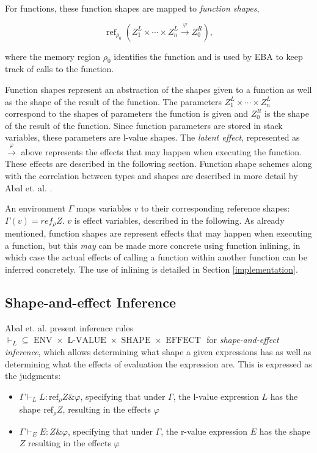 \newpar For functions, these function shapes are mapped to \textit{function shapes},

\begin{equation*}
    \operatorname{ref}_{\rho_{0}}\left(Z_{1}^{L} \times \cdots \times Z_{n}^{L} \stackrel{\varphi}{\rightarrow} Z_{0}^{R}\right),
\end{equation*} 

where the memory region $\rho_0$ identifies the function and is used by EBA to keep track of calls to the function.

\newpar Function shapes represent an abstraction of the shapes given to a function as well as the shape of the result of the function. The parameters $Z_{1}^{L} \times \cdots \times Z_{n}^{L}$ correspond to the shapes of parameters the function is given and $Z_{0}^{R}$ is the shape of the result of the function. Since function parameters are stored in stack variables, these parameters are l-value shapes. The \textit{latent effect}, represented as $\stackrel{\varphi}{\rightarrow}$ above represents the effects that may happen when executing the function. These effects are described in the following section. Function shape schemes along with the correlation between types and shapes are described in more detail by Abal et. al. \cite{Abal2017EffectiveBF}. 

\newpar An environment $\Gamma$ maps variables $v$ to their corresponding reference shapes: $\Gamma(v) = ref_\rho Z$. $v$ is effect variables, described in the following. As already mentioned, function shapes are represent effects that may happen when executing a function, but this \textit{may} can be made more concrete using function inlining, in which case the actual effects of calling a function within another function can be inferred concretely. The use of inlining is detailed in Section \ref{implementation}. 

\subsection{Shape-and-effect Inference}
Abal et. al. present inference rules $\vdash_{L} \subseteq \text { ENV } \times \text { L-VALUE } \times \text { SHAPE } \times \text { EFFECT }$ for \textit{shape-and-effect inference}, which allows determining what shape a given expressions has as well as determining what the effects of evaluation the expression are. This is expressed as the judgments: 

\begin{itemize}
    \item $\Gamma \vdash_{L} L: \text{ref}_{\rho} Z \& \varphi$, specifying that under $\Gamma$, the l-value expression $L$ has the shape $\text{ref}_\rho Z$, resulting in the effects $\varphi$
    \item $\Gamma \vdash_{E} E: Z \& \varphi$, specifying that under $\Gamma$, the r-value expression $E$ has the shape $Z$ resulting in the effects $\varphi$
\end{itemize}

